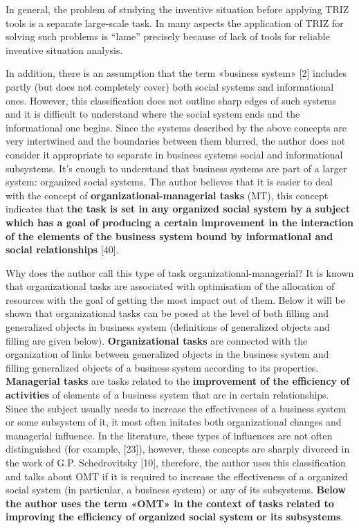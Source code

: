 \documentclass[11pt,a4paper]{book}
\begin{document}
In general, the problem of studying the inventive situation before applying
TRIZ tools is a separate large-scale task. In many aspects the application of
TRIZ for solving such problems is “lame” precisely because of lack of tools
for reliable inventive situation analysis.

In addition, there is an assumption that the term «business system» [2]
includes partly (but does not completely cover) both social systems and
informational ones.  However, this classification does not outline sharp edges
of such systems and it is difficult to understand where the social system ends
and the informational one begins. Since the systems described by the above
concepts are very intertwined and the boundaries between them blurred, the
author does not consider it appropriate to separate in business systems social
and informational subsystems.  It’s enough to understand that business systems
are part of a larger system: organized social systems.  The author believes
that it is easier to deal with the concept of
\textbf{organizational-managerial tasks} (MT), this concept indicates that
\textbf{the task is set in any organized social system by a subject which has
  a goal of producing a certain improvement in the interaction of the elements
  of the business system bound by informational and social relationships}
       [40].

Why does the author call this type of task organizational-managerial?  It is
known that organizational tasks are associated with optimisation of the
allocation of resources with the goal of getting the most impact out of them.
Below it will be shown that organizational tasks can be posed at the level of
both filling and generalized objects in business system (definitions of
generalized objects and filling are given below). \textbf{Organizational
  tasks} are connected with the organization of links between generalized
objects in the business system and filling generalized objects of a business
system according to its properties.  \textbf{Managerial tasks} are tasks
related to the \textbf{improvement of the efficiency of activities} of
elements of a business system that are in certain relationships. Since the
subject usually needs to increase the effectiveness of a business system or
some subsystem of it, it most often initates both organizational changes and
managerial influence.  In the literature, these types of influences are not
often distinguished (for example, [23]), however, these concepts are sharply
divorced in the work of G.P. Schedrovitsky [10], therefore, the author uses
this classification and talks about OMT if it is required to increase the
effectiveness of a organized social system (in particular, a business system)
or any of its subsystems. \textbf{Below the author uses the term «OMT» in the
  context of tasks related to improving the efficiency of organized social
  system or its subsystems}.
\end{document}
